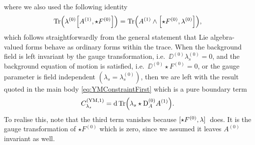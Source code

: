 \documentclass[]{jkpaper}
\theoremstyle{plain}
\theoremstyle{definition}
\newcommand{\DD}[1]{\text{D}_A#1}
\begin{document}
where we also used the following identity
\begin{equation}
    \Tr(\lambda^{(0)} \comm{A^{(1)}}{\star F^{(0)}}) = \Tr(A^{(1)} \wedge \comm{\star F^{(0)}}{\lambda^{(0)}}),
    \label{eq:traceSwitch}
\end{equation}
which follows straightforwardly from the general statement that Lie algebra-valued forms behave as ordinary forms within the trace. When the background field is left invariant by the gauge transformation, i.e.~$\DD^{(0)} \lambda_s^{(0)} = 0$, and the background equation of motion is satisfied, i.e.~$\DD^{(0)} \star F^{(0)} = 0$, or the gauge parameter is field independent $(\lambda_s=\lambda_s^{(0)})$, then we are left with the result quoted in the main body \eqref{eq:YMConstraintFirst} which is a pure boundary term
\begin{equation}
    C_{\lambda_s}^{(\text{YM},1)} = \dd \Tr(\lambda_s \star \DD^{(0)} A^{(1)}).
\end{equation}
To realise this, note that the third term vanishes because $\comm*{\star F^{(0)}}{\lambda}$ does. It is the gauge transformation of $\star F^{(0)}$ which is zero, since we assumed it leaves $A^{(0)}$ invariant as well.
\end{document}
